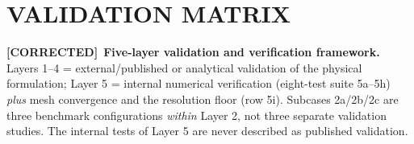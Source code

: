 \documentclass[11pt,a4paper]{article}
\newcommand{\COR}{{\color{corcol}\textbf{[CORRECTED]}}}
\begin{document}
\newpage
\section{VALIDATION MATRIX}
\label{sec:valmatrix}

\COR\ \textbf{Five-layer validation and verification framework.} Layers 1--4 = external/published or analytical validation of the physical formulation; Layer 5 = internal numerical verification (eight-test suite 5a--5h) \emph{plus} mesh convergence and the resolution floor (row 5i). Subcases 2a/2b/2c are three benchmark configurations \emph{within} Layer 2, not three separate validation studies. The internal tests of Layer 5 are never described as published validation.
\end{document}
